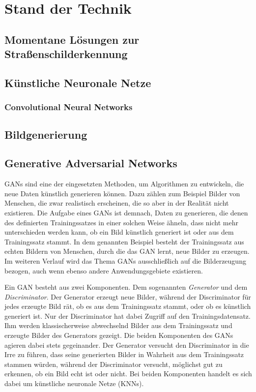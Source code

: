 \chapter{Stand der Technik}
\section{Momentane Lösungen zur Straßenschilderkennung}
\section{Künstliche Neuronale Netze}
\subsection{Convolutional Neural Networks}
\section{Bildgenerierung}
\section{Generative Adversarial Networks}
\acp{GAN} sind eine der eingesetzten Methoden, um Algorithmen zu entwickeln, die neue Daten künstlich generieren können. Dazu zählen zum Beispiel Bilder von Menschen, die zwar realistisch erscheinen, die so aber in der Realität nicht existieren. Die Aufgabe eines \acp{GAN} ist demnach, Daten zu generieren, die denen des definierten Trainingssatzes in einer solchen Weise ähneln, dass nicht mehr unterschieden werden kann, ob ein Bild künstlich generiert ist oder aus dem Trainingssatz stammt. In dem genannten Beispiel besteht der Trainingssatz aus echten Bildern von Menschen, durch die das \ac{GAN} lernt, neue Bilder zu erzeugen. Im weiteren Verlauf wird das Thema \acp{GAN} ausschließlich auf die Bilderzeugung bezogen, auch wenn ebenso andere Anwendungsgebiete existieren. \cite{visualApproach}

Ein \ac{GAN} besteht aus zwei Komponenten. Dem sogenannten \emph{Generator} und dem \emph{Discriminator}. Der Generator erzeugt neue Bilder, während der Discriminator für jedes erzeugte Bild rät, ob es aus dem Trainingssatz stammt, oder ob es künstlich generiert ist. Nur der Discriminator hat dabei Zugriff auf den Trainingsdatensatz. Ihm werden klassischerweise abwechselnd Bilder aus dem Trainingssatz und erzeugte Bilder des Generators gezeigt. Die beiden Komponenten des \acp{GAN} agieren dabei stets gegeinander. Der Generator versucht den Discriminator in die Irre zu führen, dass seine generierten Bilder in Wahrheit aus dem Trainingssatz stammen würden, während der Discriminator versucht, möglichst gut zu erkennen, ob ein Bild echt ist oder nicht. Bei beiden Komponenten handelt es sich dabei um künstliche neuronale Netze (\acp{KNN}). \cite{visualApproach}

